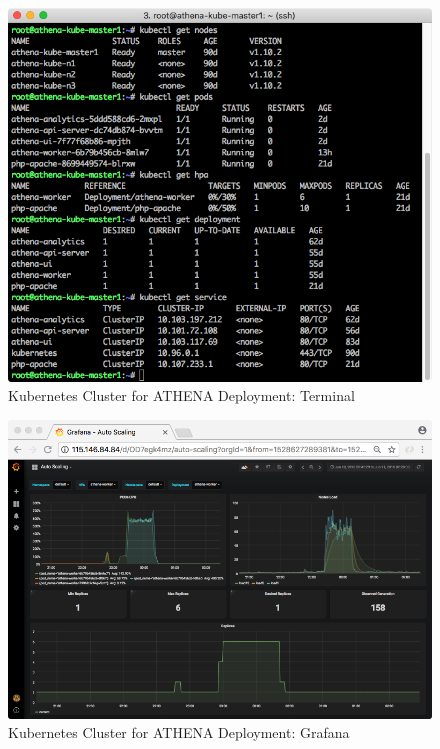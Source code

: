 \begin{figure}[H]
\centering
\includegraphics[width=0.6\paperwidth]{Figures/KUBE_ATHENA_term_long}
\decoRule
\caption[Kubernetes Cluster for ATHENA Deployment: Terminal]{Kubernetes Cluster for ATHENA Deployment: Terminal}
\label{fig:kubeAthenaTerm}
\end{figure}

\begin{figure}[H]
\centering
\includegraphics[width=0.6\paperwidth]{Figures/KUBE_ATHENA_grafana_autoscale_dash}
\decoRule
\caption[Kubernetes Cluster for ATHENA Deployment: Grafana]{Kubernetes Cluster for ATHENA Deployment: Grafana}
\label{fig:kubeAthenaGraf}
\end{figure}


